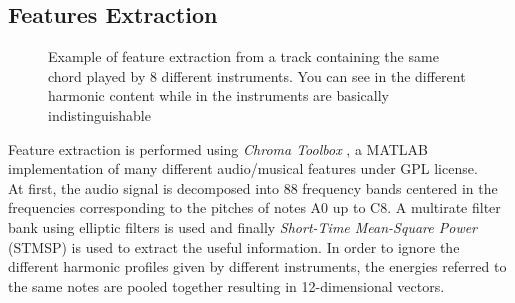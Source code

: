 \subsection{Features Extraction}
\label{subsec:features}
%
\begin{figure}[t]
	\hfill
	\hfill
	\hfill
	\vspace{-4mm}
	\caption{Example of feature extraction from a track containing the same chord played by 8 different instruments. You can see in  the different harmonic content while in  the instruments are basically indistinguishable}
	\label{fig:exampleChromaToolbox}
	\vspace{-5mm}
\end{figure}
%
Feature extraction is performed using \textit{Chroma Toolbox} \cite{ChromaToolbox}, a MATLAB implementation of many different audio/musical features under GPL license.\\
%
At first, the audio signal is decomposed into 88 frequency bands centered in the frequencies corresponding to the pitches of notes A0 up to C8. A multirate filter bank using elliptic filters is used and finally \textit{Short-Time Mean-Square Power} (STMSP) is used to extract the useful information. In order to ignore the different harmonic profiles given by different instruments, the energies referred to the same notes are pooled together resulting in 12-dimensional vectors.\\
